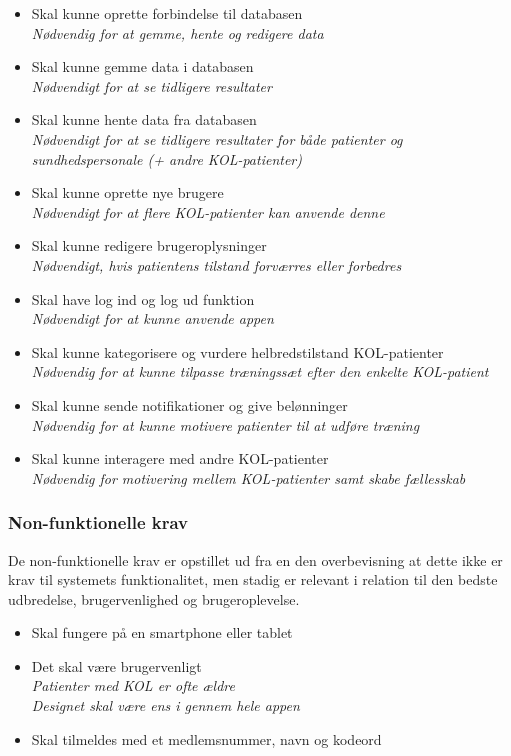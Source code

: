 \begin{itemize}
\item Skal kunne oprette forbindelse til databasen
	\\
	\textit{Nødvendig for at gemme, hente og redigere data}

\item Skal kunne gemme data i databasen
	\\
	\textit{Nødvendigt for at se tidligere resultater}

\item Skal kunne hente data fra databasen
	\\
	\textit{Nødvendigt for at se tidligere resultater for både patienter og sundhedspersonale (+ andre KOL-patienter)}	
	
\item Skal kunne oprette nye brugere 
	\\
	\textit{Nødvendigt for at flere KOL-patienter kan anvende denne}

\item Skal kunne redigere brugeroplysninger
	\\
	\textit{Nødvendigt, hvis patientens tilstand forværres eller forbedres}

\item Skal have log ind og log ud funktion
	\\
	\textit{Nødvendigt for at kunne anvende appen}

\item Skal kunne kategorisere og vurdere helbredstilstand KOL-patienter
	\\
	\textit{Nødvendig for at kunne tilpasse træningssæt efter den enkelte KOL-patient}

\item Skal kunne sende notifikationer og give belønninger 
	\\
	\textit{Nødvendig for at kunne motivere patienter til at udføre træning}

\item Skal kunne interagere med andre KOL-patienter
	\\
	\textit{Nødvendig for motivering mellem KOL-patienter samt skabe fællesskab}

\end{itemize}

\subsubsection{Non-funktionelle krav}
De non-funktionelle krav er opstillet ud fra en den overbevisning at dette ikke er krav til systemets funktionalitet, men stadig er relevant i relation til den bedste udbredelse, brugervenlighed og brugeroplevelse. 

\begin{itemize}
\item Skal fungere på en smartphone eller tablet 
\item Det skal være brugervenligt
	\\
	\textit{Patienter med KOL er ofte ældre}
	\\ 
	\textit{Designet skal være ens i gennem hele appen} 
	
\item Skal tilmeldes med et medlemsnummer, navn og kodeord
\end{itemize}